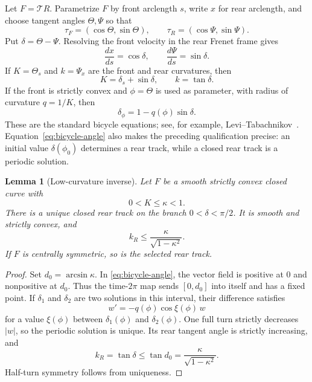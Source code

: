 \documentclass[11pt]{article}
\newtheorem{lemma}[theorem]{Lemma}
\theoremstyle{remark}
\newcommand{\Tmap}{\mathcal T}
\begin{document}
Let $F=\Tmap R$.  Parametrize $F$ by front arclength $s$, write $x$ for rear
arclength, and choose tangent angles $\Theta,\Psi$ so that
\[
  \tau_F=(\cos\Theta,\sin\Theta),
  \qquad
  \tau_R=(\cos\Psi,\sin\Psi).
\]
Put $\delta=\Theta-\Psi$.  Resolving the front velocity in the rear Frenet
frame gives
\begin{equation}\label{eq:bicycle-s}
  \frac{dx}{ds}=\cos\delta,
  \qquad
  \frac{d\Psi}{ds}=\sin\delta.
\end{equation}
If $K=\Theta_s$ and $k=\Psi_x$ are the front and rear curvatures, then
\begin{equation}\label{eq:bicycle-curv}
  K=\delta_s+\sin\delta,
  \qquad
  k=\tan\delta.
\end{equation}
If the front is strictly convex and $\phi=\Theta$ is used as parameter, with
radius of curvature $q=1/K$, then
\begin{equation}\label{eq:bicycle-angle}
  \delta_\phi=1-q(\phi)\sin\delta.
\end{equation}
These are the standard bicycle equations; see, for example,
Levi--Tabachnikov~\cite{LeviTabachnikov}.  Equation~\eqref{eq:bicycle-angle}
also makes the preceding qualification precise: an initial value
\(\delta(\phi_0)\) determines a rear track, while a closed rear track is a
periodic solution.

\begin{lemma}[Low-curvature inverse]\label{lem:lowcurv}
Let $F$ be a smooth strictly convex closed curve with
\[
  0<K\leq\kappa<1.
\]
There is a unique closed rear track on the branch $0<\delta<\pi/2$.  It is
smooth and strictly convex, and
\begin{equation}\label{eq:rear-k-bound}
  k_R\leq\frac{\kappa}{\sqrt{1-\kappa^2}}.
\end{equation}
If $F$ is centrally symmetric, so is the selected rear track.
\end{lemma}

\begin{proof}
Set \(d_0=\arcsin\kappa\).  In \eqref{eq:bicycle-angle}, the vector field is
positive at \(0\) and nonpositive at \(d_0\).  Thus the time-\(2\pi\)
map sends \([0,d_0]\) into itself and has a fixed point.  If \(\delta_1\)
and \(\delta_2\) are two solutions in this interval, their difference
satisfies
\[
  w'=-q(\phi)\cos\xi(\phi)\,w
\]
for a value \(\xi(\phi)\) between \(\delta_1(\phi)\) and
\(\delta_2(\phi)\).  One full turn strictly decreases \(|w|\), so the
periodic solution is unique.  Its rear tangent angle is strictly increasing,
and
\[
   k_R=\tan\delta\leq\tan d_0
      =\frac{\kappa}{\sqrt{1-\kappa^2}}.
\]
Half-turn symmetry follows from uniqueness.
\end{proof}
\end{document}
